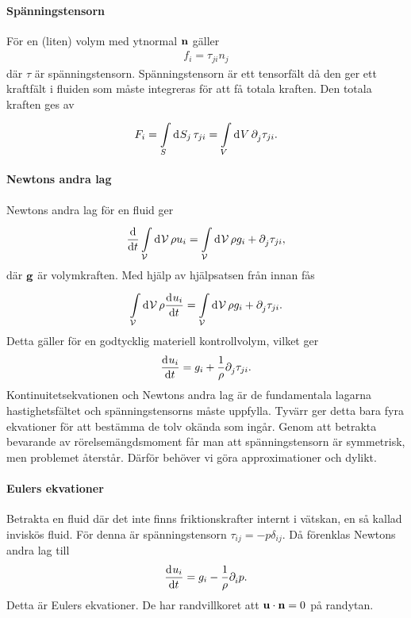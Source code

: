 \paragraph{Spänningstensorn}
För en (liten) volym med ytnormal $\vb{n}$ gäller
\begin{align*}
	f_{i} = \tau_{ji}n_{j}
\end{align*}
där $\tau$ är spänningstensorn. Spänningstensorn är ett tensorfält då den ger ett kraftfält i fluiden som måste integreras för att få totala kraften. Den totala kraften ges av
\begin{align*}
	F_{i} = \int\limits_{S}^{}\dd[]{S_{j}}\tau_{ji} = \int\limits_{V}^{}\dd[]{V}\partial_{j}^{}\tau_{ji}.
\end{align*}

\paragraph{Newtons andra lag}
Newtons andra lag för en fluid ger
\begin{align*}
	\dv{t}\int\limits_{\mathcal{V}}^{}\dd[]{\mathcal{V}}\rho u_{i} = \int\limits_{\mathcal{V}}^{}\dd[]{\mathcal{V}}\rho g_{i} + \partial_{j}^{}\tau_{ji},
\end{align*}
där $\vb{g}$ är volymkraften. Med hjälp av hjälpsatsen från innan fås
\begin{align*}
	\int\limits_{\mathcal{V}}^{}\dd[]{\mathcal{V}}\rho\dv[]{u_{i}}{t} = \int\limits_{\mathcal{V}}^{}\dd[]{\mathcal{V}}\rho g_{i} + \partial_{j}^{}\tau_{ji}.
\end{align*}
Detta gäller för en godtycklig materiell kontrollvolym, vilket ger
\begin{align*}
	\dv[]{u_{i}}{t} = g_{i} + \frac{1}{\rho}\partial_{j}^{}\tau_{ji}.
\end{align*}
Kontinuitetsekvationen och Newtons andra lag är de fundamentala lagarna hastighetsfältet och spänningstensorns måste uppfylla. Tyvärr ger detta bara fyra ekvationer för att bestämma de tolv okända som ingår. Genom att betrakta bevarande av rörelsemängdsmoment får man att spänningstensorn är symmetrisk, men problemet återstår. Därför behöver vi göra approximationer och dylikt.

\paragraph{Eulers ekvationer}
Betrakta en fluid där det inte finns friktionskrafter internt i vätskan, en så kallad inviskös fluid. För denna är spänningstensorn $\tau_{ij} = -p\delta_{ij}$. Då förenklas Newtons andra lag till
\begin{align*}
	\dv[]{u_{i}}{t} = g_{i} - \frac{1}{\rho}\partial_{i}^{}p.
\end{align*}
Detta är Eulers ekvationer. De har randvillkoret att $\vb{u}\cdot\vb{n} = 0$ på randytan.

